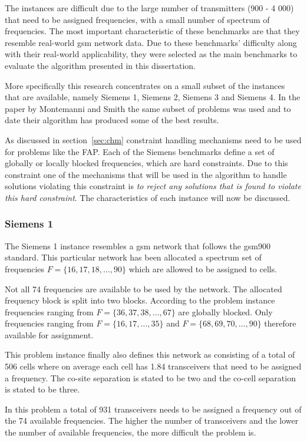 The instances are difficult due to the large number of transmitters (900 - 4 000) that need to be assigned frequencies, with a small number of spectrum of frequencies. The most important characteristic of these benchmarks are that they resemble real-world \gls{gsm} network data. Due to these benchmarks' difficulty along with their real-world applicability, they were selected as the main benchmarks to evaluate the algorithm presented in this dissertation.

More specifically this research concentrates on a small subset of the instances that are available, namely Siemens 1, Siemens 2, Siemens 3 and Siemens 4. In the paper by Montemanni and Smith \cite{TabuMontemanniSmith} the same subset of problems was used and to date their algorithm has produced some of the best results. 

As discussed in section~\ref{sec:chm} constraint handling mechanisms need to be used for problems like the \gls{FAP}. Each of the Siemens benchmarks define a set of globally or locally blocked frequencies, which are hard constraints. Due to this constraint one of the mechanisms that will be used in the algorithm to handle solutions violating this constraint is \emph{to reject any solutions that is found to violate this hard constraint}. The characteristics of each instance will now be discussed.

\subsubsection{Siemens 1}
The Siemens 1 instance resembles a \gls{gsm} network that follows the \gls{gsm}900 standard. This particular network has been allocated a spectrum set of frequencies $F = \{16,17,18,\dots,90\}$ which are allowed to be assigned to cells. 

Not all 74 frequencies are available to be used by the network. The allocated frequency block is split into two blocks. According to the problem instance frequencies ranging from $F= \{36,37,38,\dots,67\}$ are globally blocked. Only frequencies ranging from $F= \{16,17,\dots,35\}$ and $F= \{68,69,70,\dots,90\}$ therefore available for assignment.

This problem instance finally also defines this network as consisting of a total of 506 cells where on average each cell has 1.84 transceivers that need to be assigned a frequency. The co-site separation is stated to be two and the co-cell separation is stated to be three.

In this problem a total of 931 transceivers needs to be assigned a frequency out of the 74 available frequencies. The  higher the number of transceivers and the lower the number of available frequencies, the more difficult the problem is.
